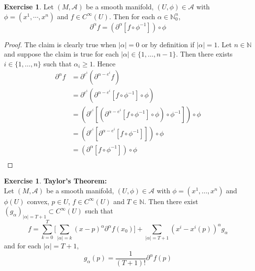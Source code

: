 \documentclass{book}
\theoremstyle{definition}
\newtheorem{ex}[definition]{Exercise}
\newcommand{\al}{\alpha}
\newcommand{\N}{\mathbb{N}}
\newcommand{\MA}{\mathcal{A}}
\DeclareMathOperator*{\0}{\mbf{0}}
\DeclareMathOperator*{\1}{\mbf{1}}
\newcommand{\p}{\partial}
\begin{document}
	\begin{ex}
	Let $(M, \MA)$ be a smooth manifold, $(U, \phi) \in \MA$ with $\phi = (x^1, \cdots, x^n)$ and $f \in C^{\infty}(U)$. Then for each $\al \in \N_0^n$, $$\p^{\al} f = (\p^{\al}[ f \circ \phi^{-1}] ) \circ \phi$$
	\end{ex}	
	
	\begin{proof}
	The claim is clearly true when $|\al| =0$ or by definition if $|\al| = 1$. Let $n \in \N$ and suppose the claim is true for each $|\al| \in \{1, \ldots, n-1 \}$. Then there exists $i \in \{1, \ldots, n\}$ such that $\al_i \geq 1$. Hence 
	\begin{align*}
	\p^{\al}f 
	&= \p^{e^i} (\p^{\al - e^i} f) \\
	&= \p^{e^i} (\p^{\al - e^i}[ f \circ \phi^{-1}] \circ \phi) \\
	&= (\p^{e^i} [(\p^{\al - e^i}[ f \circ \phi^{-1}] \circ \phi) \circ \phi^{-1} ]) \circ \phi\\
	&= (\p^{e^i} [\p^{\al - e^i}[ f \circ \phi^{-1}]] )\circ \phi\\
	&= (\p^{\al}[ f \circ \phi^{-1}] )\circ \phi\\
	\end{align*}
	\end{proof}
	
	
	\begin{ex} \textbf{Taylor's Theorem:} \\
	Let $(M, \MA)$ be a smooth manifold, $(U, \phi) \in \MA$ with $\phi = (x^1, \ldots, x^n)$ and $\phi(U)$ convex, $p \in U$, $f \in C^{\infty}(U)$ and $T \in \N$. Then there exist $(g_{\al})_{|\al| = T+1} \subset C^{\infty}(U)$ such that
		$$f = \sum_{k=0}^{T} \bigg[\sum_{|\al| = k}(x - p)^{\al} \p^{\al} f (x_0) \bigg] + \sum_{|\al| = T+1}(x^i - x^i(p))^{\al} g_{\al}$$ and for each $|\al|= T+1$, $$g_{\al}(p) = \frac{1}{(T+1)!}\p^{\al} f(p)$$
	\end{ex}
	
\end{document}
